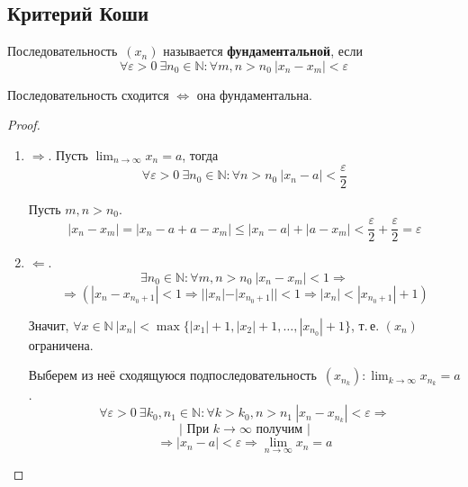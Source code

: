 \subsection{Критерий Коши}
 Последовательность~$(x_n)$ называется \textbf{фундаментальной}, если
\begin{equation*}
\forall \varepsilon > 0 \ \exists n_0 \in \mathbb N \colon \forall m, n > n_0 \ |x_n - x_m| < \varepsilon
\end{equation*}

\begin{theorem}
Последовательность сходится $\Leftrightarrow$ она фундаментальна.
\end{theorem}
\begin{proof}
\begin{enumerate}
	\item $\Rightarrow$. Пусть $\displaystyle \lim_{n \to \infty} x_n = a$, тогда
	\begin{equation*}
	\forall \varepsilon > 0 \ \exists n_0 \in \mathbb N \colon \forall n > n_0 \ |x_n - a| < \frac\varepsilon2
	\end{equation*}
	
	Пусть $m, n > n_0$.
	\begin{equation*}
	|x_n - x_m| = |x_n - a + a - x_m| \leqslant |x_n - a| + |a - x_m| < \frac\varepsilon2 + \frac\varepsilon2 = \varepsilon
	\end{equation*}
	
	\item $\Leftarrow$.
	\begin{equation*}
	\exists n_0 \in \mathbb N \colon \forall m, n > n_0 \ |x_n - x_m| < 1 \Rightarrow
	\end{equation*}
	\begin{equation*}
	\Rightarrow (|x_n - x_{n_0 + 1}| < 1 \Rightarrow
	||x_n| - |x_{n_0 + 1}|| < 1 \Rightarrow
	|x_n| < |x_{n_0 + 1}| + 1)
	\end{equation*}
	
	Значит, $\forall x \in \mathbb N \ |x_n| < \max \{ |x_1| + 1, |x_2| + 1, \ldots, |x_{n_0}| + 1 \}$, т.\,е. $(x_n)$ ограничена.
	
	Выберем из неё сходящуюся подпоследовательность~$\displaystyle (x_{n_k}): \lim_{k \to \infty} x_{n_k} = a$.
	\begin{equation*}
	\forall \varepsilon > 0 \ \exists k_0, n_1 \in \mathbb N \colon \forall k > k_0, n > n_1 \ |x_n - x_{n_k}| < \varepsilon \Rightarrow
	\end{equation*}
	\begin{equation*}
	\left| \text{ При } k \to \infty \text{ получим } \right|
	\end{equation*}
	\begin{equation*}
	\Rightarrow |x_n - a| < \varepsilon \Rightarrow
	\lim_{n \to \infty} x_n = a
	\end{equation*}
\end{enumerate}
\end{proof}